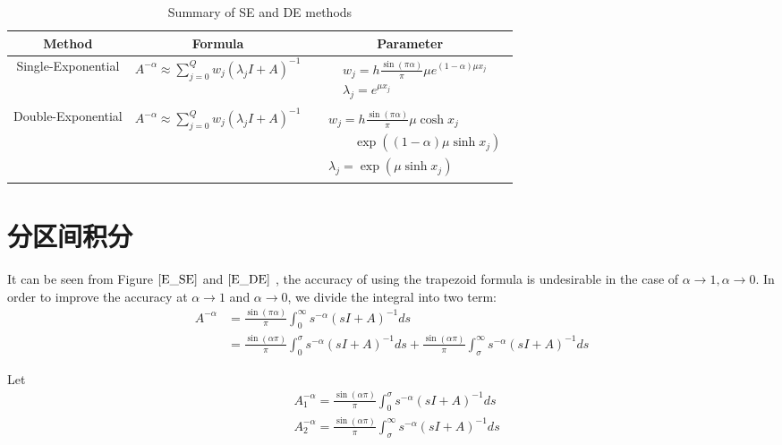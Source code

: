 \begin{table}[htbp]
	\centering
	\caption{Summary of SE and DE methods}\label{TAB_SEDE}
	\begin{tabular}
		{c|c|c}
		\toprule
		\textbf{Method}   &  \textbf{Formula}  & \textbf{Parameter}\\
		\hline
		Single-Exponential &${A}^{-\alpha}\approx \sum_{j=0}^{Q}w_j(\lambda_j I+A)^{-1}\label{SE_summary}$   &  $\begin{aligned}&w_j=h\frac{\sin(\pi \alpha)}{\pi}\mu e^{(1-\alpha)\mu x_j}\\&\lambda_j=e^{\mu x_j}\end{aligned}$ \\
		\hline
		Double-Exponential&${A}^{-\alpha}\approx \sum_{j=0}^{Q}w_j(\lambda_j I+A)^{-1}\label{DE_summary}$ & $\begin{aligned}&w_j=h\frac{\sin(\pi \alpha)}{\pi}\mu\cosh x_j\\&\qquad \exp((1-\alpha)\mu\sinh x_j )\\&\lambda_j=\exp(\mu\sinh x_j)\end{aligned}$\\
		\bottomrule
	\end{tabular}
\end{table}

\section{分区间积分}

It can be seen from  Figure $\ref{E_SE}$ and $\ref{E_DE}$ , the accuracy of using the trapezoid formula is undesirable in the case of $\alpha\rightarrow 1,\alpha\rightarrow 0 $. In order to improve the accuracy at $\alpha \rightarrow 1$ and $\alpha \rightarrow 0$, we divide the integral into two term:
\begin{equation}  \begin{aligned}   {A}^{-\alpha}&=\frac{\sin(\pi \alpha)}{\pi}\int_0^{\infty}s^{-\alpha}(s{I}+{A})^{-1}ds\\   &=\frac{\sin(\alpha \pi)}{\pi}\int_0^{\sigma}s^{-\alpha}(s{I}+{A})^{-1}ds+   \frac{\sin(\alpha \pi)}{\pi}\int_{\sigma}^{\infty}s^{-\alpha}(s{I}+{A})^{-1}ds
\end{aligned}
\label{jg}
\end{equation}

Let
\begin{equation}
\begin{aligned}
&A^{-\alpha}_1=\frac{\sin(\alpha \pi)}{\pi}\int_0^{\sigma}s^{-\alpha}(s{I}+{A})^{-1}ds\\
&A^{-\alpha}_2=\frac{\sin(\alpha \pi)}{\pi}\int_{\sigma}^{\infty}s^{-\alpha}(s{I}+{A})^{-1}ds
\end{aligned}
\end{equation}

